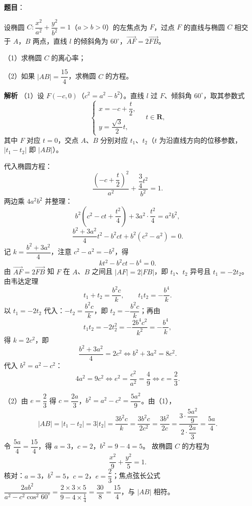 \begin{answer}

\textbf{题目}：

设椭圆 $C:\dfrac{x^2}{a^2}+\dfrac{y^2}{b^2}=1$（$a>b>0$）的左焦点为 $F$，过点 $F$ 的直线与椭圆 $C$ 相交于 $A$，$B$ 两点，直线 $l$ 的倾斜角为 $60^\circ$，$\overrightarrow{AF}=2\overrightarrow{FB}$。

（1）求椭圆 $C$ 的离心率；

（2）如果 $|AB|=\dfrac{15}{4}$，求椭圆 $C$ 的方程。

\textbf{解析}
（1）设 $F(-c,0)$（$c^2=a^2-b^2$）。直线 $l$ 过 $F$、倾斜角 $60^\circ$，取其参数式
\nopagebreak[4]
\[\begin{cases}x=-c+\dfrac t2,\\[4pt] y=\dfrac{\sqrt3}{2}t,\end{cases}\quad t\in\mathbf R,\]
其中 $F$ 对应 $t=0$，交点 $A$、$B$ 分别对应 $t_1$、$t_2$（$t$ 为沿直线方向的位移参数，$|t_1-t_2|$ 即 $|AB|$）。

代入椭圆方程：
\nopagebreak[4]
\[\frac{\left(-c+\dfrac t2\right)^2}{a^2}+\frac{\dfrac34t^2}{b^2}=1.\]
两边乘 $4a^2b^2$ 并整理：
\nopagebreak[4]
\[b^2\left(c^2-ct+\frac{t^2}{4}\right)+3a^2\cdot\frac{t^2}{4}=a^2b^2,\]
\nopagebreak[4]
\[\frac{b^2+3a^2}{4}t^2-b^2ct+b^2\left(c^2-a^2\right)=0.\]
记 $k=\dfrac{b^2+3a^2}{4}$，注意 $c^2-a^2=-b^2$，得
\nopagebreak[4]
\[kt^2-b^2ct-b^4=0.\]
由 $\overrightarrow{AF}=2\overrightarrow{FB}$ 知 $F$ 在 $A$、$B$ 之间且 $|AF|=2|FB|$，即 $t_1$、$t_2$ 异号且 $t_1=-2t_2$。由韦达定理
\nopagebreak[4]
\[t_1+t_2=\frac{b^2c}{k},\qquad t_1t_2=-\frac{b^4}{k}.\]
以 $t_1=-2t_2$ 代入：$-t_2=\dfrac{b^2c}{k}$，即 $t_2=-\dfrac{b^2c}{k}$；再由
\nopagebreak[4]
\[t_1t_2=-2t_2^2=-\frac{2b^4c^2}{k^2}=-\frac{b^4}{k},\]
得 $k=2c^2$，即
\nopagebreak[4]
\[\frac{b^2+3a^2}{4}=2c^2\iff b^2+3a^2=8c^2.\]
代入 $b^2=a^2-c^2$：
\nopagebreak[4]
\[4a^2=9c^2\iff e^2=\frac{c^2}{a^2}=\frac49\iff e=\frac23.\]

（2）由 $e=\dfrac23$ 得 $c=\dfrac{2a}{3}$，$b^2=a^2-c^2=\dfrac{5a^2}{9}$。由（1），
\nopagebreak[4]
\[|AB|=|t_1-t_2|=3|t_2|=\frac{3b^2c}{k}=\frac{3b^2c}{2c^2}=\frac{3b^2}{2c}
=\frac{3\cdot\dfrac{5a^2}{9}}{2\cdot\dfrac{2a}{3}}=\frac{5a}{4}.\]
令 $\dfrac{5a}{4}=\dfrac{15}{4}$，得 $a=3$，$c=2$，$b^2=9-4=5$。
故椭圆 $C$ 的方程为
\nopagebreak[4]
\[\frac{x^2}{9}+\frac{y^2}{5}=1.\]
核对：$a=3$，$b^2=5$，$c=2$，$e=\dfrac23$；焦点弦长公式 $\dfrac{2ab^2}{a^2-c^2\cos^2 60^\circ}=\dfrac{2\times3\times5}{9-4\times\frac14}=\dfrac{30}{8}=\dfrac{15}{4}$，与 $|AB|$ 相符。


\end{answer}
